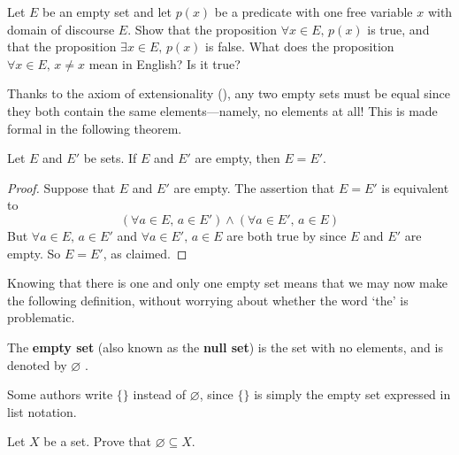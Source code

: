\begin{exercise}
Let $E$ be an empty set and let $p(x)$ be a predicate with one free variable $x$ with domain of discourse $E$. Show that the proposition $\forall x \in E,\, p(x)$ is true, and that the proposition $\exists x \in E,\, p(x)$ is false. What does the proposition $\forall x \in E,\, x \ne x$ mean in English? Is it true?
\end{exercise}

Thanks to the axiom of extensionality (), any two empty sets must be equal since they both contain the same elements---namely, no elements at all! This is made formal in the following theorem.

\begin{theorem}
\label{thmEmptySetIsUnique}
Let $E$ and $E'$ be sets. If $E$ and $E'$ are empty, then $E=E'$.
\end{theorem}
\begin{proof}
Suppose that $E$ and $E'$ are empty. The assertion that $E=E'$ is equivalent to
\[ (\forall a \in E,\, a \in E') \wedge (\forall a \in E',\, a \in E) \]
But $\forall a \in E,\, a \in E'$ and $\forall a \in E',\, a \in E$ are both true by  since $E$ and $E'$ are empty. So $E=E'$, as claimed.
\end{proof}

Knowing that there is one and only one empty set means that we may now make the following definition, without worrying about whether the word `the' is problematic.

\begin{definition}
\label{defEmptySet}
The \textbf{empty set} (also known as the \textbf{null set}) is the set with no elements, and is denoted by $\varnothing$ .
\end{definition}

Some authors write $\{ \}$ instead of $\varnothing$, since $\{ \}$ is simply the empty set expressed in list notation.

\begin{exercise}
\label{exEmptySetSubsetOfEverySet}
Let $X$ be a set. Prove that $\varnothing \subseteq X$.
\end{exercise}

